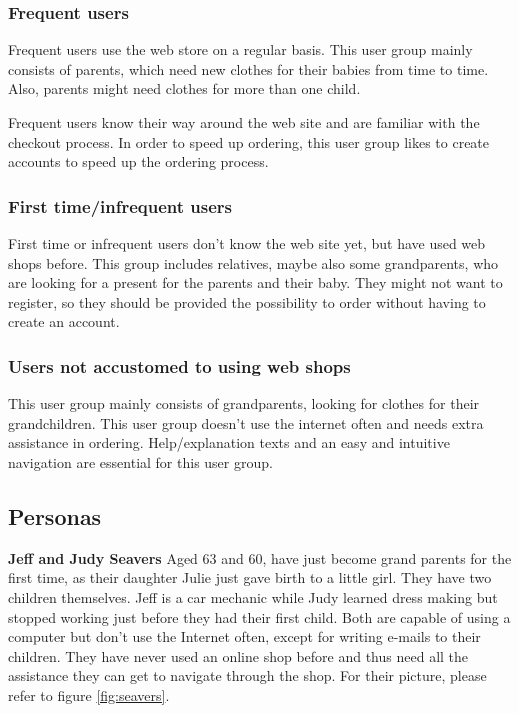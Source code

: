 \subsubsection{Frequent users}
Frequent users use the web store on a regular basis. This user group mainly consists of parents, which need new clothes for their babies from time to time.
Also, parents might need clothes for more than one child.

Frequent users know their way around the web site and are familiar with the checkout process. In order to speed up ordering, 
this user group likes to create accounts to speed up the ordering process. 

\subsubsection{First time/infrequent users}
First time or infrequent users don't know the web site yet, but have used web shops before. This group includes relatives, maybe also some grandparents, who are looking for a present for the parents and their baby. They might not want to register, so they should be provided the possibility to order without having to create an account.
 
\subsubsection{Users not accustomed to using web shops}
This user group mainly consists of grandparents, looking for clothes for their grandchildren. This user group doesn't use the internet often and needs extra assistance in ordering. Help/explanation texts and an easy and intuitive navigation are essential for this user group. 

\subsection{Personas}
\textbf{Jeff and Judy Seavers}
Aged 63 and 60, have just become grand parents for the first time, as their daughter Julie just gave birth to a little girl.
They have two children themselves. Jeff is a car mechanic while Judy learned dress making but stopped working just before they had their first child.
Both are capable of using a computer but don't use the Internet often, except for writing e-mails to their children.
They have never used an online shop before and thus need all the assistance they can get to navigate through the shop. For their picture, please refer to figure \ref{fig:seavers}.	


